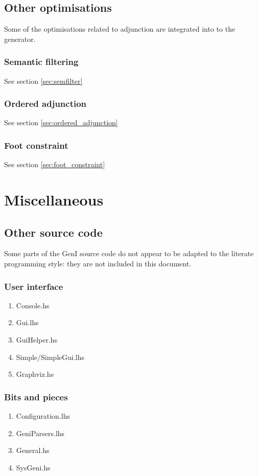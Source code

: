 \documentclass[a4paper,11pt]{report}
\begin{document}



\chapter{Other optimisations}
\label{chp:other_optimisations}

Some of the optimisations related to adjunction are integrated into
to the generator.

\section{Semantic filtering}

See section \ref{sec:semfilter}

\section{Ordered adjunction}

See section \ref{sec:ordered_adjunction}

\section{Foot constraint}

See section \ref{sec:foot_constraint}

\part{Miscellaneous}

\chapter{Other source code}
\label{cha:other}

Some parts of the GenI source code do not appear to be adapted to the
literate programming style: they are not included in this document.

\section{User interface}

\begin{enumerate}
\item{Console.hs}
\item{Gui.lhs}
\item{GuiHelper.hs}
\item{Simple/SimpleGui.lhs}
\item{Graphviz.hs}
\end{enumerate}

\section{Bits and pieces}

\begin{enumerate}
\item{Configuration.lhs}
\item{GeniParsers.lhs}
\item{General.hs}
\item{SysGeni.hs}
\end{enumerate}

{


}
\end{document}

